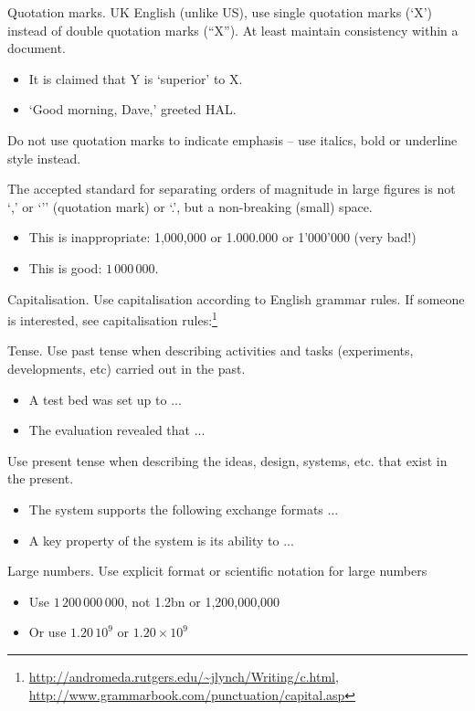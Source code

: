 Quotation marks. UK English (unlike US), use single quotation marks (‘X’) instead of double quotation marks (``X''). At least maintain consistency within a document.

\begin{itemize}
    \item It is claimed that Y is ‘superior’ to X.
    \item ‘Good morning, Dave,’ greeted HAL.
\end{itemize}

Do not use quotation marks to indicate emphasis – use italics, bold or underline style instead.

The accepted standard for separating orders of magnitude in large figures is not ‘,’ or ‘’’ (quotation mark) or ‘.’, but a non-breaking (small) space.

\begin{itemize}
    \item This is inappropriate: 1,000,000 or 1.000.000 or 1’000’000 (very bad!)
    \item This is good: $1\,000\,000$.
\end{itemize}

Capitalisation. Use capitalisation according to English grammar rules. If someone is interested, see
capitalisation rules:\footnote{\url{http://andromeda.rutgers.edu/~jlynch/Writing/c.html}, \url{http://www.grammarbook.com/punctuation/capital.asp}}

Tense. Use past tense when describing activities and tasks (experiments, developments, etc) carried out in the past.

\begin{itemize}
    \item A test bed was set up to ...
    \item The evaluation revealed that ...
\end{itemize}

Use present tense when describing the ideas, design, systems, etc. that exist in the present.

\begin{itemize}
    \item The system supports the following exchange formats ...
    \item A key property of the system is its ability to ...
\end{itemize}

Large numbers. Use explicit format or scientific notation for large numbers

\begin{itemize}
    \item Use $1\,200\,000\,000$, not 1.2bn or 1,200,000,000
    \item Or use $1.20\,10^9$ or $1.20 \times 10^9$
\end{itemize}

